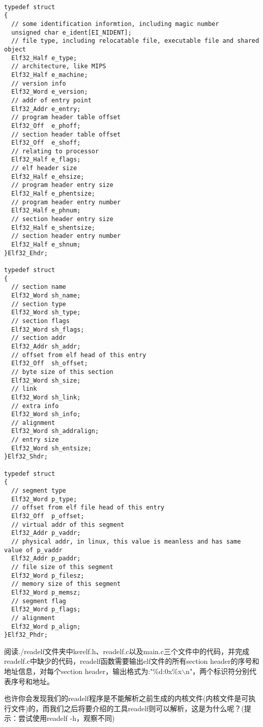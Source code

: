 \begin{verbatim}

typedef struct
{
  // some identification informtion, including magic number
  unsigned char e_ident[EI_NIDENT];
  // file type, including relocatable file, executable file and shared object
  Elf32_Half e_type;
  // architecture, like MIPS
  Elf32_Half e_machine;
  // version info
  Elf32_Word e_version;
  // addr of entry point
  Elf32_Addr e_entry;
  // program header table offset
  Elf32_Off  e_phoff;
  // section header table offset
  Elf32_Off  e_shoff;
  // relating to processor
  Elf32_Half e_flags;
  // elf header size
  Elf32_Half e_ehsize;
  // program header entry size
  Elf32_Half e_phentsize;
  // program header entry number
  Elf32_Half e_phnum;
  // section header entry size
  Elf32_Half e_shentsize;
  // section header entry number
  Elf32_Half e_shnum;
}Elf32_Ehdr;

typedef struct
{
  // section name
  Elf32_Word sh_name;
  // section type
  Elf32_Word sh_type;
  // section flags
  Elf32_Word sh_flags;
  // section addr
  Elf32_Addr sh_addr;
  // offset from elf head of this entry
  Elf32_Off  sh_offset;
  // byte size of this section
  Elf32_Word sh_size;
  // link
  Elf32_Word sh_link;
  // extra info
  Elf32_Word sh_info;
  // alignment
  Elf32_Word sh_addralign;
  // entry size
  Elf32_Word sh_entsize;
}Elf32_Shdr;

typedef struct
{
  // segment type
  Elf32_Word p_type;
  // offset from elf file head of this entry
  Elf32_Off  p_offset;
  // virtual addr of this segment
  Elf32_Addr p_vaddr;
  // physical addr, in linux, this value is meanless and has same value of p_vaddr
  Elf32_Addr p_paddr;
  // file size of this segment
  Elf32_Word p_filesz;
  // memory size of this segment
  Elf32_Word p_memsz;
  // segment flag
  Elf32_Word p_flags;
  // alignment
  Elf32_Word p_align;
}Elf32_Phdr;
\end{verbatim}

\begin{exercise}
阅读./readelf文件夹中kerelf.h、readelf.c以及main.c三个文件中的代码，并完成readelf.c中缺少的代码，readelf函数需要输出elf文件的所有section header的序号和地址信息，对每个section header，输出格式为:"\%d:0x\%x$\backslash$n"，两个标识符分别代表序号和地址。
\end{exercise}

\begin{thinking}\label{think-endian}
也许你会发现我们的readelf程序是不能解析之前生成的内核文件(内核文件是可执行文件)的，而我们之后将要介绍的工具readelf则可以解析，这是为什么呢？(提示：尝试使用readelf -h，观察不同)
\end{thinking}


